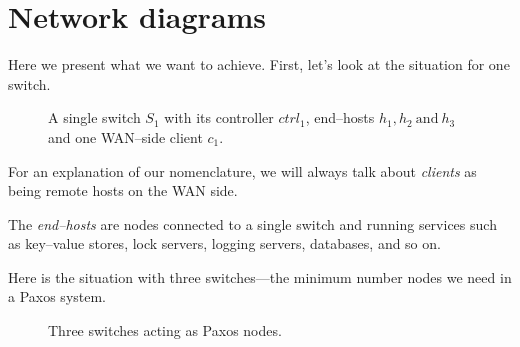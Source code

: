 \section{Network diagrams}

Here we present what we want to achieve.  First, let's look at the situation
for one switch.

\begin{figure}[H]
  \centering
  \caption{A single switch $S_1$ with its controller ${ctrl}_1$, end--hosts
    $h_1, h_2\ \text{and}\ h_3$ and one WAN--side client $c_1$.}
  \label{figure:graph.single.switch}
\end{figure}

For an explanation of our nomenclature, we will always talk about
\textit{clients} as being remote hosts on the \ac{WAN} side.

The \textit{end--hosts} are nodes connected to a single switch and running
services such as key--value stores, lock servers, logging servers,
databases, and so on.

Here is the situation with three switches---the minimum number nodes we need
in a Paxos system.

\begin{figure}[H]
  \centering
  \caption{Three switches acting as Paxos nodes.}
  \label{figure:graph.three.switches}
\end{figure}

